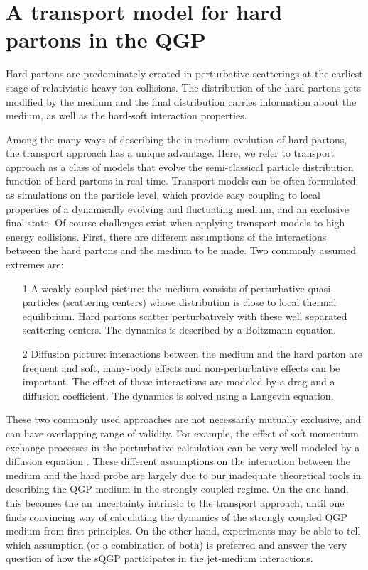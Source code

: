 \chapter{A transport model for hard partons in the QGP}
\label{chapter:transport}
Hard partons are predominately created in perturbative scatterings at the earliest stage of relativistic heavy-ion collisions.
The distribution of the hard partons gets modified by the medium and the final distribution carries information about the medium, as well as the hard-soft interaction properties.

Among the many ways of describing the in-medium evolution of hard partons, 
the transport approach has a unique advantage. 
Here, we refer to transport approach as a class of models that evolve the semi-classical particle distribution function of hard partons in real time.
Transport models can be often formulated as simulations on the particle level, which provide easy coupling to local properties of a dynamically evolving and fluctuating medium, and an exclusive final state.
Of course challenges exist when applying transport models to high energy collisions.
First, there are different assumptions of the interactions between the hard partons and the medium to be made.
Two commonly assumed extremes are:
\begin{itemize}
\item[1] A weakly coupled picture: the medium consists of perturbative quasi-particles (scattering centers) whose distribution is close to local thermal equilibrium.
Hard partons scatter perturbatively with these well separated scattering centers. The dynamics is described by a Boltzmann equation.
\item[2] Diffusion picture: interactions between the medium and the hard parton are frequent and soft, many-body effects and non-perturbative effects can be important. The effect of these interactions are modeled by a drag and a diffusion coefficient. The dynamics is solved using a Langevin equation.
\end{itemize}
These two commonly used approaches are not necessarily mutually exclusive, and can have overlapping range of validity. 
For example, the effect of soft momentum exchange processes in the perturbative calculation can be very well modeled by a diffusion equation \cite{Ghiglieri:2015ala,Dai:2019hbi}.
These different assumptions on the interaction between the medium and the hard probe are largely due to our inadequate theoretical tools in describing the QGP medium in the strongly coupled regime.
On the one hand, this becomes the an uncertainty intrinsic to the transport approach, until one finds convincing way of calculating the dynamics of the strongly coupled QGP medium from first principles.
On the other hand, experiments may be able to tell which assumption (or a combination of both) is preferred and answer the very question of how the sQGP participates in the jet-medium interactions.

